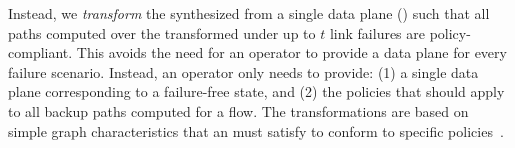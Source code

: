 Instead, we 
{\em transform} the \ARC synthesized from a single data plane
() such that all paths computed over the transformed \ARC under
up to $t$ link failures are policy-compliant. This avoids the need for an
operator to provide a data plane for every failure scenario. Instead, an
operator only needs to provide: (1) a single data plane corresponding to a
failure-free state, and (2) the policies that should apply to all backup paths
computed for a flow. The transformations are based on simple graph
characteristics that an \ARC must satisfy to conform to specific
policies~\cite{arc}.

